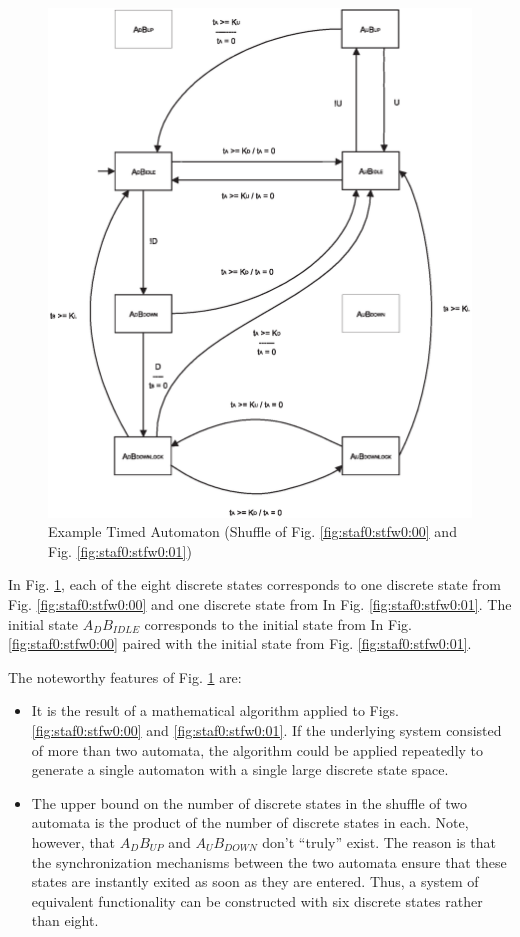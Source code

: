 \documentclass[letterpaper,10pt,titlepage]{article}
\begin{document}
\begin{figure}
\centering
\includegraphics[width=4.6in]{exta03.eps}
\caption{Example Timed Automaton (Shuffle of Fig. \ref{fig:staf0:stfw0:00} and Fig. \ref{fig:staf0:stfw0:01})}
\label{fig:staf0:stfw0:02}
\end{figure}

In Fig. \ref{fig:staf0:stfw0:02}, each of the eight discrete states
corresponds to one discrete state from Fig. \ref{fig:staf0:stfw0:00}
and one discrete state from In Fig. \ref{fig:staf0:stfw0:01}.
The initial state $A_{D}B_{IDLE}$ corresponds to the initial state
from In Fig. \ref{fig:staf0:stfw0:00} paired with the initial state
from Fig. \ref{fig:staf0:stfw0:01}.

The noteworthy features of Fig. \ref{fig:staf0:stfw0:02} are:

\begin{itemize}
\item It is the result of a mathematical algorithm applied to 
      Figs. \ref{fig:staf0:stfw0:00} and \ref{fig:staf0:stfw0:01}.
      If the underlying system consisted of more than two automata, the
      algorithm could be applied repeatedly to generate a single automaton with
      a single large discrete state space.
\item The upper bound on the number of discrete states in the shuffle
      of two automata is the product of the number of discrete states
      in each.  Note, however, that $A_{D}B_{UP}$ and $A_{U}B_{DOWN}$
      don't ``truly'' exist.  The reason is that the synchronization
      mechanisms between the two automata ensure that these states
      are instantly exited as soon as they are entered.  Thus, a system
      of equivalent functionality can be constructed with six discrete
      states rather than eight.
\end{itemize}
\end{document}
